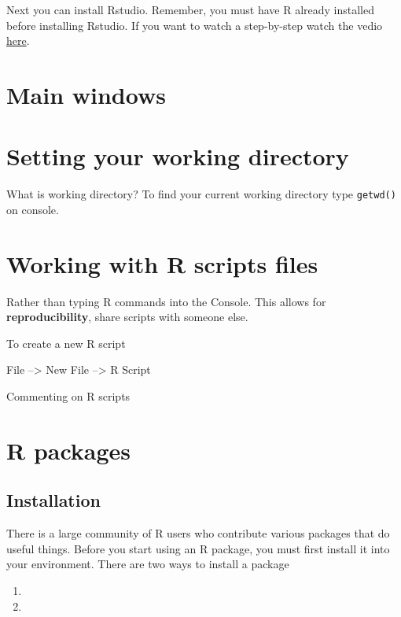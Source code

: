 \documentclass[]{book}
\begin{document}
Next you can install Rstudio. Remember, you must have R already installed before installing Rstudio. If you want to watch a step-by-step watch the vedio \href{https://www.youtube.com/watch?v=bM7Sfz-LADM\&feature=youtu.be}{here}.

\hypertarget{main-windows}{%
\section{Main windows}\label{main-windows}}

\hypertarget{setting-your-working-directory}{%
\section{Setting your working directory}\label{setting-your-working-directory}}

What is working directory? To find your current working directory type \texttt{getwd()} on console.

\hypertarget{working-with-r-scripts-files}{%
\section{Working with R scripts files}\label{working-with-r-scripts-files}}

Rather than typing R commands into the Console. This allows for \textbf{reproducibility}, share scripts with someone else.

To create a new R script

File --\textgreater{} New File --\textgreater{} R Script

Commenting on R scripts

\hypertarget{r-packages}{%
\section{R packages}\label{r-packages}}

\hypertarget{installation-1}{%
\subsection{Installation}\label{installation-1}}

There is a large community of R users who contribute various packages that do useful things. Before you start using an R package, you must first install it into your environment. There are two ways to install a package

\begin{enumerate}
\def\labelenumi{\arabic{enumi}.}
\item
\item
\end{enumerate}
\end{document}

